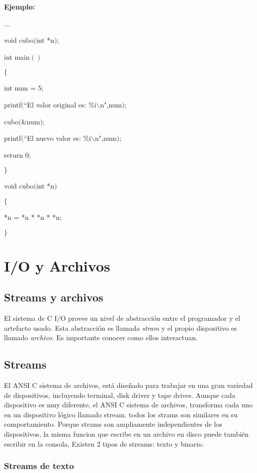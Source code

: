 \documentclass[]{article}
\begin{document}
	\textbf{Ejemplo:\\}
	
	...
	
	void cubo$($int *n$)$;
	
	int main$()$
	
	$\lbrace$
	
	int num = 5;
	
	printf$($``El valor original es: \%i$\backslash$n",num$)$;
	
	cubo$($\&num$)$;
	
	printf$($``El nuevo valor es: \%i$\backslash$n",num$)$;
	
	return 0;
	
	$\rbrace$
	
	void cubo$($int *n$)$
	
	$\lbrace$
	
	*n = *n * *n * *n;
	
	$\rbrace$
	
	\section{I/O y Archivos}
	
	\subsection{Streams y archivos}
	
	El sistema de C I/O provee un nivel de abstracción entre el programador y el artefacto usado. Esta abstracción es llamada \textit{stram} y el propio dispositivo es llamado \textit{archivo}. Es importante conocer como ellos interactuan.
	
	\subsection{Streams}
	
	El ANSI C sistema de archivos, está diseñado para trabajar en una gran variedad de dispositivos, incluyendo terminal, disk driver y tape drives. Aunque cada dispositivo es muy diferente, el ANSI C sistema de archivos, transforma cada uno en un dispositivo lógico llamado stream. todos los strams son similares en su comportamiento. Porque strams son ampliamente independientes de los dispositivos, la misma funcion que escribe en un archivo en disco puede también escribir en la consola, Existen 2 tipos de streams: texto y binario.
	
	\subsubsection{Streams de texto}
	
\end{document}
